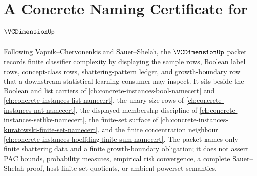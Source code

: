 \chapter{A Concrete Naming Certificate for $\VCDimensionUp$}
\label{ch:concrete-instances-vc-dimension-namecert}

Following Vapnik--Chervonenkis and Sauer--Shelah, the $\VCDimensionUp$
packet records finite classifier complexity by displaying the sample rows,
Boolean label rows, concept-class rows, shattering-pattern ledger, and
growth-boundary row that a downstream statistical-learning consumer may
inspect. It sits beside the Boolean and list carriers of
\autoref{ch:concrete-instances-bool-namecert} and
\autoref{ch:concrete-instances-list-namecert}, the unary size rows of
\autoref{ch:concrete-instances-nat-namecert}, the displayed membership
discipline of \autoref{ch:concrete-instances-setlike-namecert}, the finite-set
surface of \autoref{ch:concrete-instances-kuratowski-finite-set-namecert}, and
the finite concentration neighbour
\autoref{ch:concrete-instances-hoeffding-finite-sum-namecert}. The packet
names only finite shattering data and a finite growth-boundary obligation; it
does not assert PAC bounds, probability measures, empirical risk convergence,
a complete Sauer--Shelah proof, host finite-set quotients, or ambient powerset
semantics.


